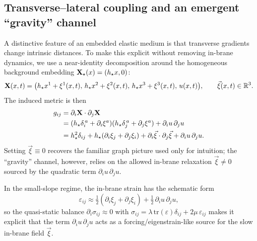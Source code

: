 \subsection{Transverse--lateral coupling and an emergent ``gravity'' channel}
\label{subsec:gravity-channel}

A distinctive feature of an embedded elastic medium is that transverse gradients change intrinsic distances.
To make this explicit without removing in-brane dynamics, we use a near-identity decomposition around the
homogeneous background embedding $\mathbf{X}_\star(x)=(h_\star x,0)$:
\begin{equation}
  \mathbf{X}(x,t)=\big(h_\star x^1+\xi^1(x,t),\,h_\star x^2+\xi^2(x,t),\,h_\star x^3+\xi^3(x,t),\,u(x,t)\big),
  \qquad \vec\xi(x,t)\in\mathbb{R}^3.
  \label{eq:near-identity-embedding}
\end{equation}
The induced metric is then
\begin{align}
  g_{ij}
  &= \partial_i\mathbf{X}\cdot\partial_j\mathbf{X} \nonumber\\
  &= (h_\star\delta_i^{\,a}+\partial_i\xi^a)(h_\star\delta_j^{\,a}+\partial_j\xi^a)+\partial_i u\,\partial_j u \nonumber\\
  &= h_\star^2\delta_{ij}+h_\star(\partial_i\xi_j+\partial_j\xi_i)+\partial_i\vec\xi\cdot\partial_j\vec\xi+\partial_i u\,\partial_j u.
  \label{eq:metric-near-identity}
\end{align}
Setting $\vec\xi\equiv 0$ recovers the familiar graph picture used only for intuition; the ``gravity'' channel,
however, relies on the allowed in-brane relaxation $\vec\xi\neq 0$ sourced by the quadratic term
$\partial_i u\,\partial_j u$.

In the small-slope regime, the in-brane strain has the schematic form
\begin{equation}
  \varepsilon_{ij}\approx \tfrac12(\partial_i\xi_j+\partial_j\xi_i)+\tfrac12\,\partial_i u\,\partial_j u,
  \label{eq:strain-near-identity}
\end{equation}
so the quasi-static balance $\partial_i\sigma_{ij}\approx 0$ with
$\sigma_{ij}=\lambda\,\mathrm{tr}(\varepsilon)\delta_{ij}+2\mu\,\varepsilon_{ij}$ makes it explicit that
the term $\partial_i u\,\partial_j u$ acts as a forcing/eigenstrain-like source for the slow in-brane field
$\vec\xi$.

